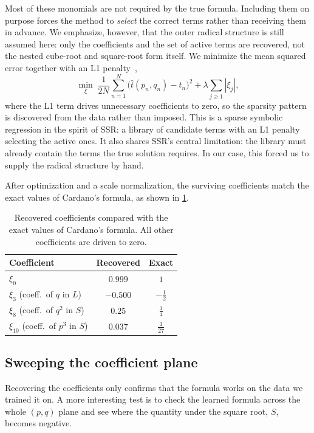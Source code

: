 \documentclass[11pt]{article}
\theoremstyle{plain}
\theoremstyle{definition}
\begin{document}
Most of these monomials are not required by the true formula. Including
them on purpose forces the method to \emph{select} the correct terms
rather than receiving them in advance. We emphasize, however, that the
outer radical structure is still assumed here: only the coefficients and
the set of active terms are recovered, not the nested cube-root and
square-root form itself. We minimize the mean squared error
together with an L1 penalty~\cite{tibshirani1996lasso},
\begin{equation}
\label{eq:cubic-objective}
\min_{\xi}\;
\frac{1}{2N}\sum_{n=1}^{N}
\big(\hat{t}(p_n, q_n) - t_n\big)^2
+ \lambda \sum_{j \geq 1} |\xi_j|,
\end{equation}
where the L1 term drives unnecessary coefficients to zero, so the
sparsity pattern is discovered from the data rather than imposed. This is a sparse symbolic regression in the spirit of SSR: a library of candidate
terms with an L1 penalty selecting the active ones. It also shares SSR's central limitation: the library must already contain the terms the true solution requires. In our case, this forced us to supply the radical structure by hand. 

After optimization and a scale normalization, the surviving coefficients match the exact values of Cardano's formula, as shown in \cref{tab:cardano-coeffs}.
 
\begin{table}[!ht]
\centering
\caption{Recovered coefficients compared with the exact values of
Cardano's formula. All other coefficients are driven to zero.}
\label{tab:cardano-coeffs}
\begin{tabular}{lcc}
\toprule
Coefficient & Recovered & Exact \\
\midrule
$\xi_0$    & $0.999$  & $1$            \\
$\xi_3$ (coeff.\ of $q$ in $L$)      & $-0.500$ & $-\tfrac{1}{2}$ \\
$\xi_8$ (coeff.\ of $q^2$ in $S$)    & $0.25$  & $\tfrac{1}{4}$  \\
$\xi_{10}$ (coeff.\ of $p^3$ in $S$) & $0.037$ & $\tfrac{1}{27}$ \\
\bottomrule
\end{tabular}
\end{table}

\subsection*{Sweeping the coefficient plane}
Recovering the coefficients only confirms that the formula works on the
data we trained it on. A more interesting test is to check the learned
formula across the whole $(p, q)$ plane and see where the quantity under
the square root, $S$, becomes negative. 
\end{document}
